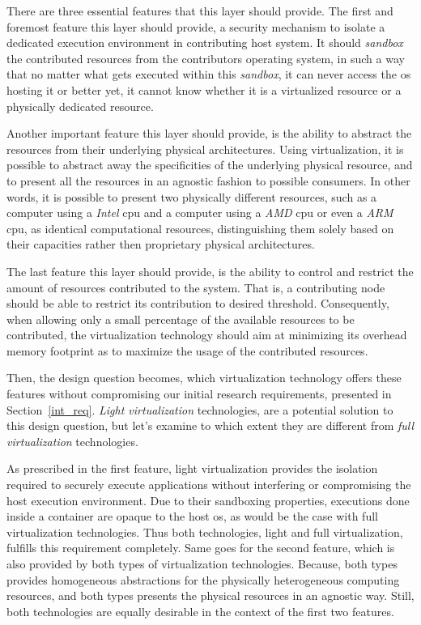 \documentclass[12pt, titlepage]{uo_temp}
\begin{document}
     There are three essential features that this layer should provide. The first and
     foremost feature this layer should provide, a security mechanism to isolate a
     dedicated execution environment in contributing host system. It should \emph{sandbox}
     the contributed resources from the contributors operating system, in such a way that
     no matter what gets executed within this \emph{sandbox}, it can never access the
     \gls{os} hosting it or better yet, it cannot know whether it is a virtualized
     resource or a physically dedicated resource.
     
     Another important feature this layer should provide, is the ability to abstract the
     resources from their underlying physical architectures. Using virtualization, it is
     possible to abstract away the specificities of the underlying physical resource, and
     to present all the resources in an agnostic fashion to possible consumers. In other
     words, it is possible to present two physically different resources, such as a
     computer using a \emph{Intel} \gls{cpu} and a computer using a \emph{AMD} \gls{cpu}
     or even a \emph{ARM} \gls{cpu}, as identical computational resources, distinguishing
     them solely based on their capacities rather then proprietary physical architectures.
     
     The last feature this layer should provide, is the ability to control and restrict
     the amount of resources contributed to the system. That is, a contributing node
     should be able to restrict its contribution to desired threshold. Consequently, when
     allowing only a small percentage of the available resources to be contributed, the
     virtualization technology should aim at minimizing its overhead memory footprint as
     to maximize the usage of the contributed resources.
     
     Then, the design question becomes, which virtualization technology offers these
     features without compromising our initial research requirements, presented in
     Section~\ref{int_req}. \emph{Light virtualization} technologies, are a potential
     solution to this design question, but let's examine to which extent they are
     different from \emph{full virtualization} technologies.

     As prescribed in the first feature, light virtualization provides the isolation
     required to securely execute applications without interfering or compromising the
     host execution environment. Due to their sandboxing properties, executions done
     inside a container are opaque to the host \gls{os}, as would be the case with full
     virtualization technologies. Thus both technologies, light and full virtualization,
     fulfills this requirement completely. Same goes for the second feature, which is also
     provided by both types of virtualization technologies. Because, both types provides
     homogeneous abstractions for the physically heterogeneous computing resources, and
     both types presents the physical resources in an agnostic way. Still, both
     technologies are equally desirable in the context of the first two features.
\end{document}
